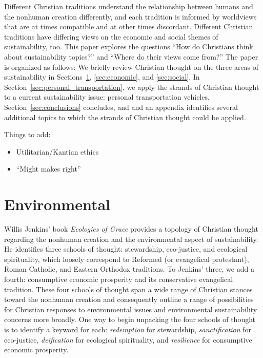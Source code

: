 \documentclass[12pt]{article}
\begin{document}
Different Christian traditions understand the relationship 
between humans and the nonhuman creation differently, and
each tradition is informed by worldviews 
that are at times compatible and at other times discordant. 
Different Christian traditions have differing views 
on the economic and social themes of sustainability, too.
This paper explores the questions 
``How do Christians think about sustainability topics?'' 
and 
``Where do their views come from?'' 
The paper is organized as follows:
We briefly review Christian thought on the three areas of sustainability
in Sections~\ref{sec:environmental}, \ref{sec:economic}, and \ref{sec:social}.
In Section~\ref{sec:personal_transportation}, 
we apply the strands of Christian thought
to a current sustainability issue: 
personal transportation vehicles.
Section~\ref{sec:conclusions} concludes, and
and an appendix identifies several additional topics to which 
the strands of Christian thought could be applied.

Things to add:

\begin{itemize}

  \item Utilitarian/Kantian ethics

  \item ``Might makes right''

\end{itemize}


\section{Environmental}
\label{sec:environmental}

Willis Jenkins' book \emph{Ecologies of Grace} \autocite{Jenkins:2008}
provides a topology of Christian thought regarding the 
nonhuman creation and the
environmental aspect of sustainability.
He identifies three schools of thought:
stewardship, 
eco-justice, and 
ecological spirituality,
which loosely correspond to 
Reformed (or evangelical protestant), 
Roman Catholic, and 
Eastern Orthodox 
traditions.
To Jenkins' three, we add a fourth:
consumptive economic prosperity and
its conservative evangelical tradition. 
These four schools of thought 
span a wide range of Christian stances toward the nonhuman creation
and 
consequently outline a range of possibilities 
for Christian responses to environmental issues
and environmental sustainability concerns more broadly.
One way to begin unpacking the four schools of thought 
is to identify a keyword for each:
\emph{redemption} for stewardship, 
\emph{sanctification} for eco-justice,
\emph{deification} for ecological spirituality, and
\emph{resilience} for consumptive economic prosperity.
\end{document}

